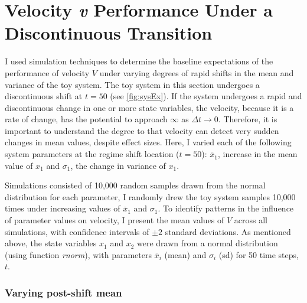 \documentclass[12pt,twoside,openany]{reedthesis}
\begin{document}
\hypertarget{velocity-v-performance-under-a-discontinuous-transition}{%
\section{\texorpdfstring{Velocity \emph{v} Performance Under a Discontinuous Transition}{Velocity v Performance Under a Discontinuous Transition}}\label{velocity-v-performance-under-a-discontinuous-transition}}

I used simulation techniques to determine the baseline expectations of the performance of velocity \(V\) under varying degrees of rapid shifts in the mean and variance of the toy system. The toy system in this section undergoes a discontinuous shift at \(t = 50\) (see \ref{fig:sysEx}). If the system undergoes a rapid and discontinuous change in one or more state variables, the velocity, because it is a rate of change, has the potential to approach \(\infty\) as \(\Delta t \rightarrow 0\). Therefore, it is important to understand the degree to that velocity can detect very sudden changes in mean values, despite effect sizes. Here, I varied each of the following system parameters at the regime shift location (\(t=50\)): \(\bar{x}_1\), increase in the mean value of \(x_1\) and \(\sigma_1\), the change in variance of \(x_1\).

Simulations consisted of 10,000 random samples drawn from the normal distribution for each parameter, I randomly drew the toy system samples 10,000 times under increasing values of \(\bar{x}_1\) and \(\sigma_1\). To identify patterns in the influence of parameter values on velocity, I present the mean values of \(V\) across all simulations, with confidence intervals of \(\pm 2\) standard deviations. As mentioned above, the state variables \(x_1\) and \(x_2\) were drawn from a normal distribution (using function \emph{rnorm}), with parameters \(\bar{x}_i\) (mean) and \(\sigma_i\) (sd) for 50 time steps, \(t\).

\hypertarget{varying-post-shift-mean}{%
\subsubsection{Varying post-shift mean}\label{varying-post-shift-mean}}
\end{document}
